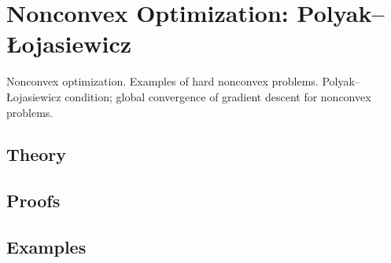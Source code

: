 
\section{Nonconvex Optimization: Polyak–Łojasiewicz}
\label{sec:2.4.12-nonconvex-optimization}

\begin{ticket}
Nonconvex optimization. Examples of hard nonconvex problems. Polyak–Łojasiewicz condition; global convergence of gradient descent for nonconvex problems.
\end{ticket}

\subsection*{Theory}

\subsection*{Proofs}

\subsection*{Examples}
